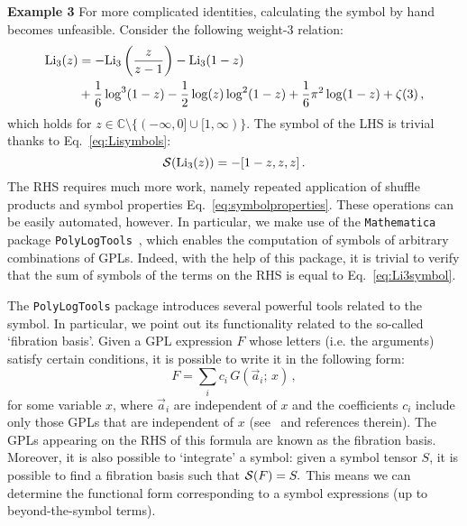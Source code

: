 \documentclass[main.tex]{subfiles}
\begin{document}
\textbf{Example 3} \newline
For more complicated identities, calculating the symbol by hand becomes unfeasible. Consider the following weight-3 relation:
\begin{align}
    \text{Li}_3(z)&=-\text{Li}_3\left(\frac{z}{z-1}\right)-\text{Li}_3(1-z) \nonumber \\
    &+\frac{1}{6} \log ^3(1-z)-\frac{1}{2} \log (z) \log ^2(1-z)+\frac{1}{6} \pi ^2 \log (1-z)+\zeta (3)\,,
\end{align}
which holds for $z \in \mathbb{C} \setminus\{(-\infty, 0] \cup [1, \infty)\}$. The symbol of the LHS is trivial thanks to Eq.~\ref{eq:Lisymbols}:
\begin{equation} \label{eq:Li3symbol}
    \mathcal{S}(\text{Li}_3(z)) = -[1-z,z,z]\,.
\end{equation}
The RHS requires much more work, namely repeated application of shuffle products and symbol properties Eq.~\ref{eq:symbolproperties}. These operations can be easily automated, however. In particular, we make use of the \texttt{Mathematica} package \texttt{PolyLogTools}~\cite{Duhr:2019tlz}, which enables the computation of symbols of arbitrary combinations of GPLs. Indeed, with the help of this package, it is trivial to verify that the sum of symbols of the terms on the RHS is equal to Eq.~\ref{eq:Li3symbol}.

The \texttt{PolyLogTools} package introduces several powerful tools related to the symbol. In particular, we point out its functionality related to the so-called `fibration basis'. Given a GPL expression $F$ whose letters (i.e. the arguments) satisfy certain conditions, it is possible to write it in the following form:
\begin{equation}
    F = \sum_i c_i\, G(\vec{a}_i;\, x)\,,
\end{equation}
for some variable $x$, where $\vec{a}_i$ are independent of $x$ and the coefficients $c_i$ include only those GPLs that are independent of $x$ (see~\cite{Duhr:2019tlz} and references therein). The GPLs appearing on the RHS of this formula are known as the fibration basis. Moreover, it is also possible to `integrate' a symbol: given a symbol tensor $S$, it is possible to find a fibration basis such that $\mathcal{S}(F) = S.$  This means we can determine the functional form corresponding to a symbol expressions (up to beyond-the-symbol terms). 
\end{document}
